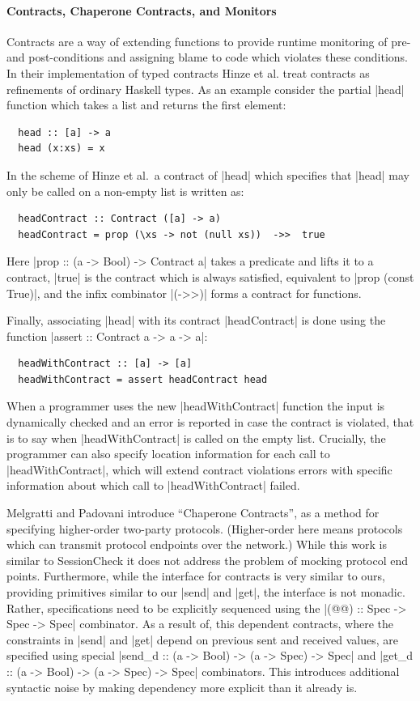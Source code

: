 \documentclass{article}
\begin{document}
\paragraph{Contracts, Chaperone Contracts, and Monitors}
%
Contracts \cite{Contracts} are a way of extending functions to provide runtime
monitoring of pre- and post-conditions and assigning blame to code which
violates these conditions.
%
In their implementation of typed contracts Hinze et al. \cite{ContractsHinze}
treat contracts as refinements of ordinary Haskell types.
%
As an example consider the partial |head| function which takes a list and
returns the first element:
%
\begin{verbatim}
  head :: [a] -> a
  head (x:xs) = x
\end{verbatim}
%
In the scheme of Hinze et al.\ a contract of |head| which specifies that |head|
may only be called on a non-empty list is written as:
%
\begin{verbatim}
  headContract :: Contract ([a] -> a)
  headContract = prop (\xs -> not (null xs))  ->>  true
\end{verbatim}
%
Here |prop :: (a -> Bool) -> Contract a| takes a predicate and lifts
it to a contract, |true| is the contract which is always satisfied,
equivalent to |prop (const True)|, and the infix combinator |(->>)|
forms a contract for functions.

%
Finally, associating |head| with its contract |headContract| is done
using the function |assert :: Contract a -> a -> a|:
%
\begin{verbatim}
  headWithContract :: [a] -> [a]
  headWithContract = assert headContract head
\end{verbatim}
%
When a programmer uses the new |headWithContract| function the input is
dynamically checked and an error is reported in case the contract is violated,
that is to say when |headWithContract| is called on the empty list.
%
Crucially, the programmer can also specify location information for each call to
|headWithContract|, which will extend contract violations errors with specific
information about which call to |headWithContract| failed.

Melgratti and Padovani \cite{ChaperoneContracts} introduce ``Chaperone
Contracts'', as a method for specifying higher-order two-party
protocols. (Higher-order here means protocols which can transmit
protocol endpoints over the network.)
%
While this work is similar to SessionCheck it does not address the problem
of mocking protocol end points.
%
Furthermore, while the interface for contracts is very similar to ours,
providing primitives similar to our |send| and |get|, the interface is not
monadic.
%
Rather, specifications need to be explicitly sequenced using the
|(@@) :: Spec -> Spec -> Spec| combinator.
%
As a result of, this dependent contracts, where the constraints in |send| and
|get| depend on previous sent and received values, are specified using
special |send_d :: (a -> Bool) -> (a -> Spec) -> Spec| and
|get_d :: (a -> Bool) -> (a -> Spec) -> Spec| combinators.
%
This introduces additional syntactic noise by making dependency more
explicit than it already is.
\end{document}
